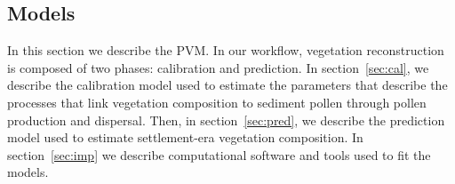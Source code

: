 \documentclass[12pt]{article}
\begin{document}



\subsection{Models}
\label{sec:models}

In this section we describe the PVM. In our workflow,
vegetation reconstruction is composed of two phases: calibration and
prediction. In section~\ref{sec:cal}, we describe the calibration
model used to estimate the parameters that describe the processes that
link vegetation composition to sediment pollen through pollen
production and dispersal. Then, in section~\ref{sec:pred}, we describe
the prediction model used to estimate settlement-era vegetation
composition. In section~\ref{sec:imp} we describe computational
software and tools used to fit the models.
\end{document}
